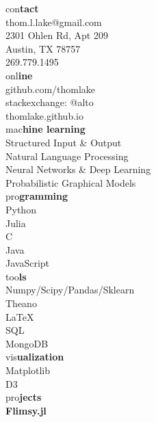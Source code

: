 \documentclass[10pt]{article}
\newcommand{\heada}[1]{\textcolor{shadecolor}{\LARGE{#1}}}
\newcommand{\headb}[1]{\textcolor{shadecolor}{\textbf{\LARGE{#1}}}}
\begin{document}
\vspace{2cm}

\begin{paracol}{2}
\begin{leftcolumn}
    \begin{flushright}
        \heada{con}\headb{tact}\\[0.25cm]
        thom.l.lake@gmail.com\\
        2301 Ohlen Rd, Apt 209\\
        Austin, TX 78757\\
        269.779.1495\\[0.5cm]
        \heada{onl}\headb{ine}\\[0.25cm]
        github.com/thomlake\\
        stackexchange: @alto\\
        thomlake.github.io\\[0.5cm]
        \heada{mac}\headb{hine learning}\\[0.25cm]
        Structured Input \& Output\\
        Natural Language Processing\\
        Neural Networks \& Deep Learning\\
        Probabilistic Graphical Models\\[0.5cm]
        \heada{pro}\headb{gramming}\\[0.25cm]
        Python\\[0.0cm]
        Julia\\
        C\\
        Java\\
        JavaScript\\[0.5cm]
        \heada{too}\headb{ls}\\[0.25cm]
        Numpy/Scipy/Pandas/Sklearn\\
        Theano\\
        \LaTeX\\
        SQL\\
        MongoDB\\[0.5cm]
        \heada{vis}\headb{ualization}\\[0.25cm]
        Matplotlib\\
        D3\\[0.5cm]
        \heada{pro}\headb{jects}\\[0.25cm]
        \textbf{Flimsy.jl} \\

\end{flushright}
\end{leftcolumn}
\end{paracol}
\end{document}
